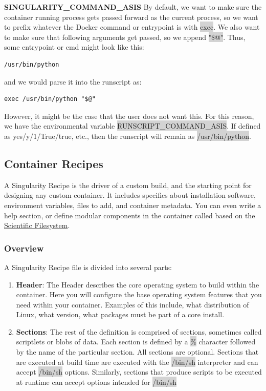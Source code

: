 \documentclass[a4paper]{article}
\begin{document}
\textbf{SINGULARITY\_COMMAND\_ASIS} By default, we want to make sure the container running process gets passed forward as the current process, so we want to prefix whatever the Docker command or entrypoint is with \colorbox{lightgray}{exec}. We also want to make sure that following arguments get passed, so we append \colorbox{lightgray}{"\$@"}. Thus, some entrypoint or cmd might look like this:

\begin{lstlisting}[frame=single]  
/usr/bin/python
\end{lstlisting}

and we would parse it into the runscript as:

\begin{lstlisting}[frame=single]  
exec /usr/bin/python "$@"
\end{lstlisting}

However, it might be the case that the user does not want this. For this reason, we have the environmental variable \colorbox{lightgray}{RUNSCRIPT\_COMMAND\_ASIS}. If defined as yes/y/1/True/true, etc., then the runscript will remain as \colorbox{lightgray}{/usr/bin/python}.

\subsection{Container Recipes}
\label{sec:recipefile}

A Singularity Recipe is the driver of a custom build, and the starting point for designing any custom container. It includes specifics about installation software, environment variables, files to add, and container metadata. You can even write a help section, or define modular components in the container called based on the \href{https://sci-f.github.io/}{Scientific Filesystem}.

\subsubsection{Overview}

A Singularity Recipe file is divided into several parts:
\begin{enumerate}
\item \textbf{Header}: The Header describes the core operating system to build within the container. Here you will configure the base operating system features that you need within your container. Examples of this include, what distribution of Linux, what version, what packages must be part of a core install.
\item \textbf{Sections}: The rest of the definition is comprised of sections, sometimes called scriptlets or blobs of data. Each section is defined by a \colorbox{lightgray}{\%} character followed by the name of the particular section. All sections are optional. Sections that are executed at build time are executed with the \colorbox{lightgray}{/bin/sh} interpreter and can accept \colorbox{lightgray}{/bin/sh} options. Similarly, sections that produce scripts to be executed at runtime can accept options intended for \colorbox{lightgray}{/bin/sh}
\end{enumerate}
\end{document}
